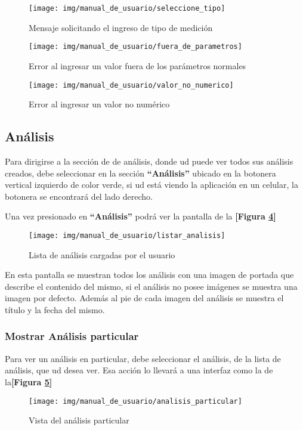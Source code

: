    \begin{figure}
   	\centering
   	\texttt{[image: img/manual\_de\_usuario/seleccione\_tipo]}
   	\caption{Mensaje solicitando el ingreso de tipo de medición}
   	\label{mu-seleccione_tipo}
   \end{figure}


        \begin{figure}
        	\centering
        	\texttt{[image: img/manual\_de\_usuario/fuera\_de\_parametros]}
        	\caption{Error al ingresar un valor fuera de los parámetros normales}
        	\label{mu-fuera_de_parametros}
        \end{figure}
        
        
                \begin{figure}
                	\centering
                	\texttt{[image: img/manual\_de\_usuario/valor\_no\_numerico]}
                	\caption{Error al ingresar un valor no numérico}
                	\label{mu-valor_no_numerico}
                \end{figure}
                
                
                
\subsection{Análisis}
Para dirigirse a la sección de  de análisis, donde ud puede ver todos sus análisis creados, debe seleccionar en la sección \textbf{``Análisis''} ubicado en la botonera vertical izquierdo de color verde, si ud está viendo la aplicación en un celular, la botonera se encontrará del lado derecho.

Una vez presionado en \textbf{``Análisis''} podrá ver la pantalla de la \textbf{[Figura \ref{mu-listar_analisis}]}


\begin{figure}
	\centering
	\texttt{[image: img/manual\_de\_usuario/listar\_analisis]}
	\caption{Lista de análisis cargadas por el usuario}
	\label{mu-listar_analisis}
\end{figure}
 
 
 En esta pantalla se muestran todos los análisis con una imagen de portada que describe  el contenido del mismo, si el análisis no posee imágenes se muestra una imagen por defecto. Además al pie de cada imagen del análisis se muestra el título y la fecha del mismo.
 

 \subsubsection{Mostrar Análisis particular}
Para ver un análisis en particular, debe seleccionar el análisis, de la lista de análisis, que ud desea ver. Esa acción lo llevará a una interfaz como la de la\textbf{[Figura \ref{mu-analisis_particular}]}
\begin{figure}
	\centering
	\texttt{[image: img/manual\_de\_usuario/analisis\_particular]}
	\caption{Vista del análisis particular}
	\label{mu-analisis_particular}
\end{figure}


